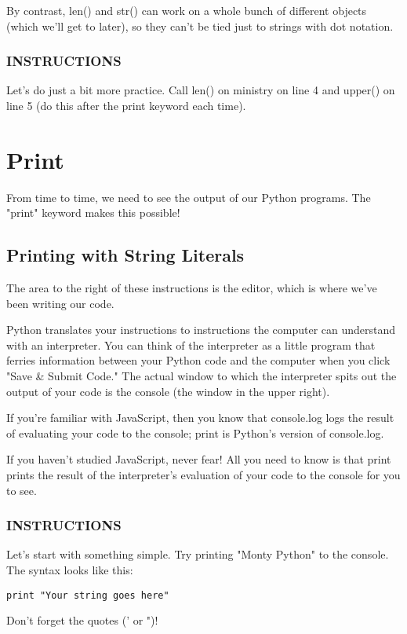 \documentclass[12pt,a4paper,final,twoside,onecolumn,titlepage]{book}
\begin{document}
By contrast, len() and str() can work on a whole bunch of different objects (which we'll get to later), so they can't be tied just to strings with dot notation.

\subsubsection{INSTRUCTIONS}
Let's do just a bit more practice. Call len() on ministry on line 4 and upper() on line 5 (do this after the print keyword each time).

\section{Print}
From time to time, we need to see the output of our Python programs. The "print" keyword makes this possible!

\subsection{Printing with String Literals}
The area to the right of these instructions is the editor, which is where we've been writing our code.

Python translates your instructions to instructions the computer can understand with an interpreter. You can think of the interpreter as a little program that ferries information between your Python code and the computer when you click "Save \& Submit Code." The actual window to which the interpreter spits out the output of your code is the console (the window in the upper right).

If you're familiar with JavaScript, then you know that console.log logs the result of evaluating your code to the console; print is Python's version of console.log.

If you haven't studied JavaScript, never fear! All you need to know is that print prints the result of the interpreter's evaluation of your code to the console for you to see.

\subsubsection{INSTRUCTIONS}
Let's start with something simple. Try printing "Monty Python" to the console. The syntax looks like this:
\begin{lstlisting}
print "Your string goes here"
\end{lstlisting}
Don't forget the quotes (' or ")!
\end{document}
